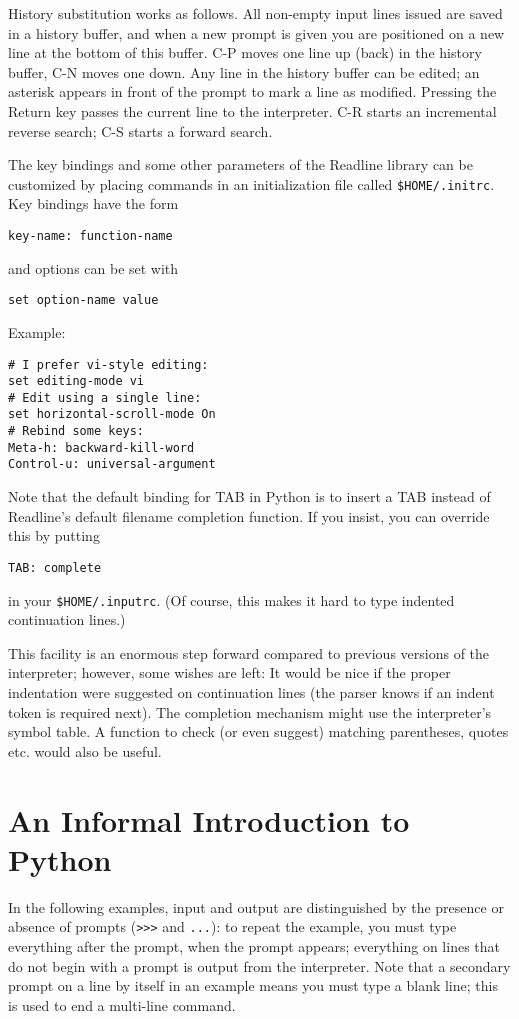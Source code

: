History substitution works as follows.
All non-empty input lines issued are saved in a history buffer,
and when a new prompt is given you are positioned on a new line at the
bottom of this buffer.
C-P moves one line up (back) in the history buffer, C-N moves one down.
Any line in the history buffer can be edited; an asterisk appears in
front of the prompt to mark a line as modified.
Pressing the Return key passes the current line to the interpreter.
C-R starts an incremental reverse search; C-S starts a forward search.

The key bindings and some other parameters of the Readline library can
be customized by placing commands in an initialization file called
{\tt \$HOME/.initrc}.
Key bindings have the form
\bcode\begin{verbatim}
key-name: function-name
\end{verbatim}\ecode
and options can be set with
\bcode\begin{verbatim}
set option-name value
\end{verbatim}\ecode
Example:
\bcode\begin{verbatim}
# I prefer vi-style editing:
set editing-mode vi
# Edit using a single line:
set horizontal-scroll-mode On
# Rebind some keys:
Meta-h: backward-kill-word
Control-u: universal-argument
\end{verbatim}\ecode
Note that the default binding for TAB in Python is to insert a TAB
instead of Readline's default filename completion function.
If you insist, you can override this by putting
\bcode\begin{verbatim}
TAB: complete
\end{verbatim}\ecode
in your
{\tt \$HOME/.inputrc}.
(Of course, this makes it hard to type indented continuation lines.)

This facility is an enormous step forward compared to previous versions of
the interpreter; however, some wishes are left:
It would be nice if the proper indentation were suggested on
continuation lines (the parser knows if an indent token is required
next).
The completion mechanism might use the interpreter's symbol table.
A function to check (or even suggest) matching parentheses, quotes
etc. would also be useful.

\section{An Informal Introduction to Python}

In the following examples, input and output are distinguished by the
presence or absence of prompts ({\tt >>>} and {\tt ...}): to repeat the
example, you must type everything after the prompt, when the prompt
appears; everything on lines that do not begin with a prompt is output
from the interpreter.
Note that a secondary prompt on a line by itself in an example means you
must type a blank line; this is used to end a multi-line command.


